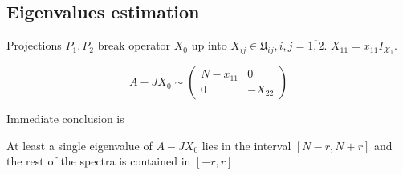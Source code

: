 \documentclass{article}
\begin{document}
\subsection{Eigenvalues estimation}
Projections $P_1, P_2$ break operator $X_0$ up into $X_{ij}\in\mathfrak U_{ij}, i,j=\overline{1,2}$.
$X_{11} = x_{11} I_{\mathcal X_1}$.

\[
    A-JX_0 \sim
    \left(
\begin{array}{c|c}
    N-x_{11} & 0 \\
    \hline
    0        & -X_{22}
\end{array}
\right)
\]

Immediate conclusion is
\begin{lemma}
    At least a single eigenvalue of $A-JX_0$ lies in the interval $\left[N-r,N+r\right]$
    and the rest of the spectra is contained in $\left[-r,r\right]$
\end{lemma}

%
\end{document}
